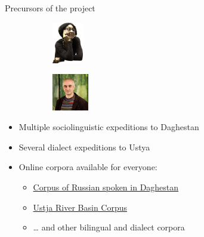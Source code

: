 \documentclass[
  ignorenonframetext,
  t]{beamer}
\providecommand{\tightlist}{%
  \setlength{\itemsep}{0pt}\setlength{\parskip}{0pt}}\usepackage{longtable,booktabs,array}
\begin{document}
\begin{frame}{Precursors of the project}
\label{precursors-of-the-project-1}
\begin{figure}

\begin{minipage}{0.50\linewidth}

\begin{figure}[H]

{\centering \includegraphics[width=0.53in,height=\textheight]{images/dobrushina.jpg}

}


\end{figure}%

\end{minipage}%
%
\begin{minipage}{0.50\linewidth}

\begin{figure}[H]

{\centering \includegraphics[width=0.63in,height=\textheight]{images/daniel.png}

}


\end{figure}%

\end{minipage}%

\end{figure}%

\begin{itemize}
\tightlist
\item
  Multiple sociolinguistic expeditions to Daghestan
\item
  Several dialect expeditions to Ustya \pause
\item
  Online corpora available for everyone:

  \begin{itemize}
  \tightlist
  \item
    \href{https://parasolcorpus.org/dagrus/}{Corpus of Russian spoken in
    Daghestan}
  \item
    \href{https://www.parasolcorpus.org/Pushkino/login.php}{Ustja River
    Basin Corpus} \pause
  \item
    \ldots{} and other bilingual and dialect corpora
  \end{itemize}
\end{itemize}
\end{frame}
\end{document}
